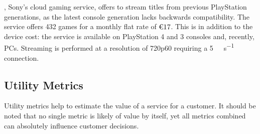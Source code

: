 
\psnow, Sony's cloud gaming service, offers to stream titles from previous
PlayStation generations, as the latest console generation lacks
backwards compatibility.
The service offers 432 games for a monthly flat rate of
$\text{\texteuro}17$.
This is in addition to
the device cost: the service is available on PlayStation 4 and 3
consoles and, recently, \glspl{PC}.
Streaming is performed at a resolution of
720p60 requiring a \SI{5}{\mega\bit\per\second}
connection.



%


\subsection{Utility Metrics}

Utility metrics help to estimate the value of a service for a customer.
It should be noted that no single metric is likely of value by itself,
yet all metrics combined can absolutely influence customer decisions.

